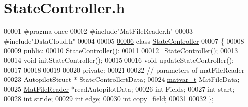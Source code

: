 \hypertarget{_state_controller_8h_source}{}\section{State\+Controller.\+h}
\label{_state_controller_8h_source}

\begin{DoxyCode}
00001 \textcolor{preprocessor}{#pragma once}
00002 \textcolor{preprocessor}{#include"MatFileReader.h"}
00003 \textcolor{preprocessor}{#include"DataCloud.h"}
00004 
00005 
\hyperlink{class_state_controller}{00006} \textcolor{keyword}{class }\hyperlink{class_state_controller}{StateController}
00007 \{
00008 
00009 \textcolor{keyword}{public}:
00010     \hyperlink{class_state_controller}{StateController}();
00011 
00012     ~\hyperlink{class_state_controller}{StateController}();
00013 
00014     \textcolor{keywordtype}{void} initStateController();
00015 
00016     \textcolor{keywordtype}{void} updateStateController();
00017 
00018     
00019     
00020 \textcolor{keyword}{private}:
00021 
00022     \textcolor{comment}{// parameters of matFileReader}
00023     AutopilotStruct * StateControllertData;
00024     \hyperlink{group___m_a_t_structmatvar__t}{matvar\_t} MatFileData;
00025     \hyperlink{class_mat_file_reader}{MatFileReader} *readAutopilotData;
00026     \textcolor{keywordtype}{int} Fields;
00027     \textcolor{keywordtype}{int} start;
00028     \textcolor{keywordtype}{int} stride;
00029     \textcolor{keywordtype}{int} edge;
00030     \textcolor{keywordtype}{int} copy\_field;
00031 
00032 \};
\end{DoxyCode}
